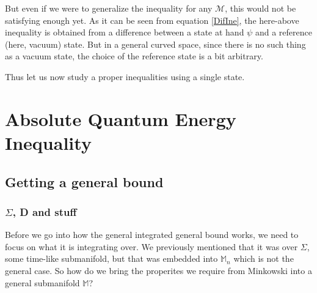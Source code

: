 \documentclass[a4paper,11pt]{article}
\numberwithin{equation}{section}
\theoremstyle{definition}
\begin{document}
But even if we were to generalize the inequality for any $\mathcal{M}$, this would not be satisfying enough yet. As it can be seen from equation \ref{DifIne}, the here-above inequality is obtained from a difference between a state at hand $\psi$ and a reference (here, vacuum) state. But in a general curved space, since there is no such thing as a vacuum state, the choice of the reference state is a bit arbitrary. 

Thus let us now study a proper inequalities using a single state.

\section{Absolute Quantum Energy Inequality}
\subsection{Getting a general bound}
\subsubsection{\color{red}$\Sigma$, D and stuff}
Before we go into how the general integrated general bound works, we need to focus on what it is integrating over. We previously mentioned that it was over $\Sigma$, some time-like submanifold, but that was embedded into $\mathbb{M}_n$ which is not the general case. So how do we bring the properites we require from Minkowski into a general submanifold $\mathbb{M}$?
\end{document}
